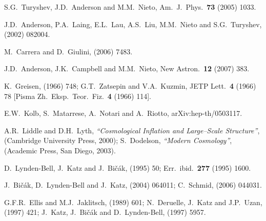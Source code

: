 \documentclass[12pt]{article}
\begin{document}
\begin{thebibliography}{66}
S.G.~Turyshev, J.D.~Anderson and M.M.~Nieto,
Am.\ J.\ Phys.\ {\bf73} (2005) 1033. %

J.D.~Anderson, P.A.~Laing, E.L.~Lau, A.S.~Liu, M.M.~Nieto and S.G.~Turyshev,
 (2002) 082004. %

M.~Carrera and D.~Giulini,
 (2006) 7483. %

J.D.~Anderson, J.K.~Campbell and M.M.~Nieto,
New Astron.\ {\bf12} (2007) 383. %

K.~Greisen,
 (1966) 748;
G.T.~Zatsepin and V.A.~Kuzmin,
JETP Lett.\ {\bf4} (1966) 78
[Pisma Zh.\ Eksp.\ Teor.\ Fiz.\ {\bf 4} (1966) 114].

E.W.~Kolb, S.~Matarrese, A.~Notari and A.~Riotto,
arXiv:hep-th/0503117.

A.R.~Liddle and D.H.~Lyth,
{\em``Cosmological Inflation and Large--Scale Structure''},
(Cambridge University Press, 2000);
S.~Dodelson,
{\em``Modern Cosmology''},
(Academic Press, San Diego, 2003).

D.~Lynden-Bell, J.~Katz and J.~Bi\v{c}\'ak,
 (1995) 50; Err.\ ibid.\ {\bf277} (1995) 1600.

J.~Bi\v{c}\'ak, D.~Lynden-Bell and J.~Katz,
 (2004) 064011; %
C.~Schmid,
 (2006) 044031. %

G.F.R.~Ellis and M.J.~Jaklitsch,
 (1989) 601;
N.~Deruelle, J.~Katz and J.P.~Uzan,
 (1997) 421; %
J.~Katz, J.~Bi\v{c}\'ak and D.~Lynden-Bell,
 (1997) 5957. %


\end{thebibliography}
\end{document}

